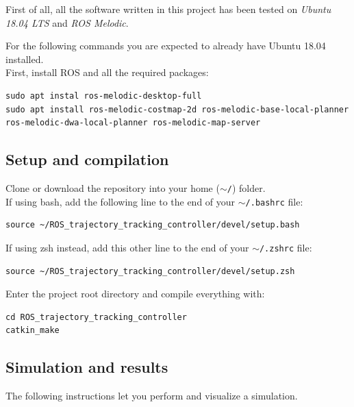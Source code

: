 \documentclass[11pt,a4paper]{article}
\begin{document}
First of all, all the software written in this project has been tested on \textit{Ubuntu 18.04 LTS}
and \textit{ROS Melodic}.

For the following commands you are expected to already have Ubuntu 18.04 installed.\\

First, install ROS and all the required packages:

\begin{lstlisting}
sudo apt instal ros-melodic-desktop-full
sudo apt install ros-melodic-costmap-2d ros-melodic-base-local-planner ros-melodic-dwa-local-planner ros-melodic-map-server
\end{lstlisting}



\subsection{Setup and compilation}

Clone or download the repository into your home (\texttt{$\sim$/}) folder.\\

If using bash, add the following line to the end of your \texttt{$\sim$/.bashrc} file:
\begin{lstlisting}
source ~/ROS_trajectory_tracking_controller/devel/setup.bash
\end{lstlisting}

If using zsh instead, add this other line to the end of your \texttt{$\sim$/.zshrc} file:
\begin{lstlisting}
source ~/ROS_trajectory_tracking_controller/devel/setup.zsh
\end{lstlisting}

Enter the project root directory and compile everything with:
\begin{lstlisting}
cd ROS_trajectory_tracking_controller
catkin_make
\end{lstlisting}



\subsection{Simulation and results}

The following instructions let you perform and visualize a simulation.
\end{document}
